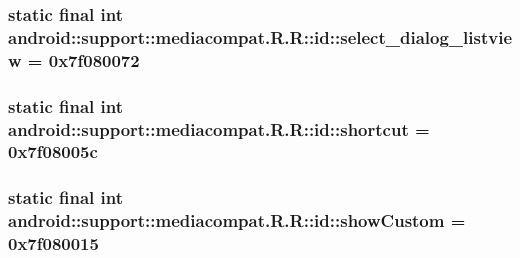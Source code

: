 \hypertarget{classandroid_1_1support_1_1mediacompat_1_1_r_1_1id_40ae64ca02935cffa8fd9fe43386f0d8}{
\subsubsection[{select\_\-dialog\_\-listview}]{\setlength{\rightskip}{0pt plus 5cm}static final int android::support::mediacompat.R.R::id::select\_\-dialog\_\-listview = 0x7f080072}}
\label{classandroid_1_1support_1_1mediacompat_1_1_r_1_1id_40ae64ca02935cffa8fd9fe43386f0d8}


\hypertarget{classandroid_1_1support_1_1mediacompat_1_1_r_1_1id_04fdecb2661b288fee6899e9133d7ffc}{
\subsubsection[{shortcut}]{\setlength{\rightskip}{0pt plus 5cm}static final int android::support::mediacompat.R.R::id::shortcut = 0x7f08005c}}
\label{classandroid_1_1support_1_1mediacompat_1_1_r_1_1id_04fdecb2661b288fee6899e9133d7ffc}


\hypertarget{classandroid_1_1support_1_1mediacompat_1_1_r_1_1id_0557e13076a8c2e1f7a674b512c95655}{
\subsubsection[{showCustom}]{\setlength{\rightskip}{0pt plus 5cm}static final int android::support::mediacompat.R.R::id::showCustom = 0x7f080015}}
\label{classandroid_1_1support_1_1mediacompat_1_1_r_1_1id_0557e13076a8c2e1f7a674b512c95655}


